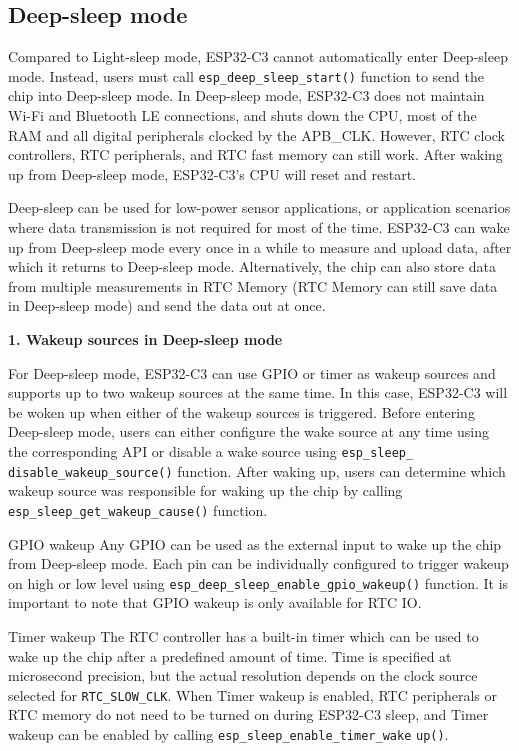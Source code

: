 \documentclass[a4paper,12pt]{book}
\begin{document}
\subsection{Deep-sleep mode}
Compared to Light-sleep mode, ESP32-C3 cannot automatically enter Deep-sleep mode. Instead, users must call \verb|esp_deep_sleep_start()| function to send the chip into Deep-sleep mode. In Deep-sleep mode, ESP32-C3 does not maintain Wi-Fi and Bluetooth LE connections, and shuts down the CPU, most of the RAM and all digital peripherals clocked by the APB\_CLK. However, RTC clock controllers, RTC peripherals, and RTC fast memory can still work. After waking up from Deep-sleep mode, ESP32-C3’s CPU will reset and restart.

Deep-sleep can be used for low-power sensor applications, or application scenarios where data transmission is not required for most of the time. ESP32-C3 can wake up from Deep-sleep mode every once in a while to measure and upload data, after which it returns to Deep-sleep mode. Alternatively, the chip can also store data from multiple measurements in RTC Memory (RTC Memory can still save data in Deep-sleep mode) and send the data out at once.

\textbf{1. Wakeup sources in Deep-sleep mode}

For Deep-sleep mode, ESP32-C3 can use GPIO or timer as wakeup sources and supports up to two wakeup sources at the same time. In this case, ESP32-C3 will be woken up when either of the wakeup sources is triggered. Before entering Deep-sleep mode, users can either configure the wake source at any time using the corresponding API or disable a wake source using \verb|esp_sleep_ disable_wakeup_source()| function. After waking up, users can determine which wakeup source was responsible for waking up the chip by calling \verb|esp_sleep_get_wakeup_cause()| function.

\begin{term}{GPIO wakeup}
    Any GPIO can be used as the external input to wake up the chip from Deep-sleep mode. Each pin can be individually configured to trigger wakeup on high or low level using \verb|esp_deep_sleep_enable_gpio_wakeup()| function. It is important to note that GPIO wakeup is only available for RTC IO.
\end{term}

\begin{term}{Timer wakeup}
    The RTC controller has a built-in timer which can be used to wake up the chip after a predefined amount of time. Time is specified at microsecond precision, but the actual resolution depends on the clock source selected for \verb|RTC_SLOW_CLK|. When Timer wakeup is enabled, RTC peripherals or RTC memory do not need to be turned on during ESP32-C3 sleep, and Timer wakeup can be enabled by calling \verb|esp_sleep_enable_timer_wake| \verb|up()|.
\end{term}
\end{document}
